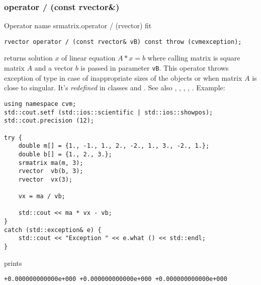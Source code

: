 \subsubsection{operator / (const rvector\&)}
Operator%
\pdfdest name {srmatrix.operator / (rvector)} fit
\begin{verbatim}
rvector operator / (const rvector& vB) const throw (cvmexception);
\end{verbatim}
returns solution $x$ of linear equation
$A*x=b$ where calling matrix is square matrix $A$
and a vector $b$ is passed in parameter \verb"vB".
This operator throws exception 
of type 
in case of inappropriate sizes
of the objects or when  matrix $A$ is close to singular.
It's \emph{redefined} in classes  and .
See also , 
, 
, 
, .
Example:
\begin{Verbatim}
using namespace cvm;
std::cout.setf (std::ios::scientific | std::ios::showpos);
std::cout.precision (12);

try {
    double m[] = {1., -1., 1., 2., -2., 1., 3., -2., 1.};
    double b[] = {1., 2., 3.};
    srmatrix ma(m, 3);
    rvector  vb(b, 3);
    rvector  vx(3);

    vx = ma / vb;

    std::cout << ma * vx - vb;
}
catch (std::exception& e) {
    std::cout << "Exception " << e.what () << std::endl;
}
\end{Verbatim}
prints
\begin{Verbatim}
+0.000000000000e+000 +0.000000000000e+000 +0.000000000000e+000
\end{Verbatim}
\newpage




